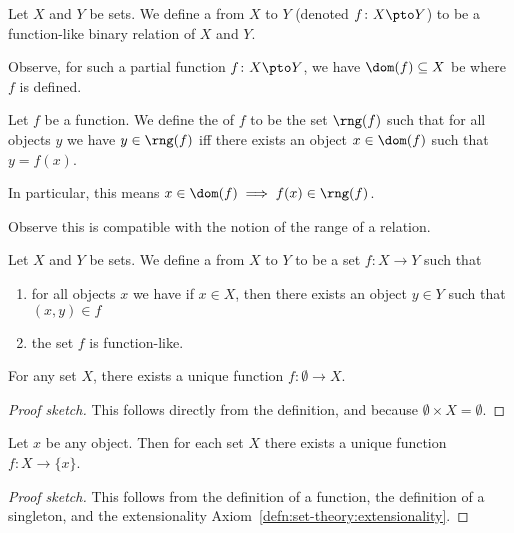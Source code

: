 \begin{definition}
Let $X$ and $Y$ be sets. We define a  from
$X$ to $Y$ (denoted $f\colon X\pto Y$) to be a function-like binary relation
of $X$ and $Y$.

Observe, for such a partial function $f\colon X\pto Y$, we have
$\dom(f)\subset X$ be where $f$ is defined.
\end{definition}

\begin{definition}
Let $f$ be a function. We define the  of $f$ to be the
set $\rng(f)$ such that for all objects $y$ we have $y\in\rng(f)$ iff
there exists an object $x\in\dom(f)$ such that $y=f(x)$.

In particular, this means $x\in\dom(f)\implies f(x)\in\rng(f)$.

Observe this is compatible with the notion of the range of a relation.
\end{definition}

\begin{definition}
Let $X$ and $Y$ be sets. We define a  from $X$ to $Y$
to be a set $f\colon X\to Y$ such that
\begin{enumerate}
\item for all objects $x$ we have if $x\in X$, then there exists an
  object $y\in Y$ such that $(x,y)\in f$
\item the set $f$ is function-like.
\end{enumerate}
\end{definition}

\begin{theorem}
For any set $X$, there exists a unique function $f\colon\emptyset\to X$.
\end{theorem}

\begin{proof}[Proof sketch]
This follows directly from the definition, and because
$\emptyset\times X=\emptyset$.
\end{proof}

\begin{theorem}
Let $x$ be any object. Then for each set $X$ there exists a unique
function $f\colon X\to\{x\}$.
\end{theorem}

\begin{proof}[Proof sketch]
This follows from the definition of a function, the definition of a
singleton, and the extensionality Axiom~\ref{defn:set-theory:extensionality}.
\end{proof}

